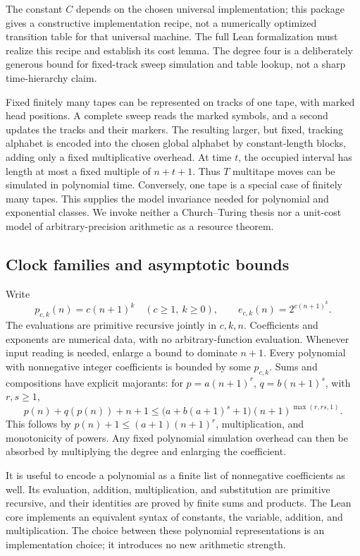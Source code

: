 The constant \(C\) depends on the chosen universal implementation; this
package gives a constructive implementation recipe, not a numerically
optimized transition table for that universal machine. The full Lean
formalization must realize this recipe and establish its cost lemma. The
degree four is a deliberately generous bound for fixed-track sweep
simulation and table lookup, not a sharp time-hierarchy claim.

Fixed finitely many tapes can be represented on tracks of one tape, with
marked head positions. A complete sweep reads the marked symbols, and a
second updates the tracks and their markers. The resulting larger, but
fixed, tracking alphabet is encoded into the chosen global alphabet by
constant-length blocks, adding only a fixed multiplicative overhead.
At time \(t\), the occupied
interval has length at most a fixed multiple of \(n+t+1\). Thus \(T\)
multitape moves can be simulated in polynomial time. Conversely, one tape is
a special case of finitely many tapes. This supplies the model invariance
needed for polynomial and exponential classes. We invoke neither a
Church--Turing thesis nor a unit-cost model of arbitrary-precision arithmetic
as a resource theorem.

\subsection{Clock families and asymptotic bounds}

Write
\[
 p_{c,k}(n)=c(n+1)^k\quad(c\ge1,\ k\ge0),\qquad
 e_{c,k}(n)=2^{c(n+1)^k}.
\]
The evaluations are primitive recursive jointly in \(c,k,n\). Coefficients
and exponents are numerical data, with no arbitrary-function evaluation.
Whenever input reading is needed, enlarge a bound to dominate \(n+1\).
Every polynomial with nonnegative integer coefficients is bounded by some
\(p_{c,k}\). Sums and compositions have explicit majorants: for
\(p=a(n+1)^r\), \(q=b(n+1)^s\), with \(r,s\ge1\),
\[
 p(n)+q(p(n))+n+1
 \le\bigl(a+b(a+1)^s+1\bigr)(n+1)^{\max(r,rs,1)}.
\]
This follows by \(p(n)+1\le(a+1)(n+1)^r\), multiplication, and monotonicity
of powers. Any fixed polynomial simulation overhead can then be absorbed by
multiplying the degree and enlarging the coefficient.

It is useful to encode a polynomial as a finite list of nonnegative
coefficients as well. Its evaluation, addition, multiplication, and
substitution are primitive recursive, and their identities are proved by
finite sums and products. The Lean core implements an equivalent syntax of
constants, the variable, addition, and multiplication. The choice between
these polynomial representations is an implementation choice; it introduces
no new arithmetic strength.

